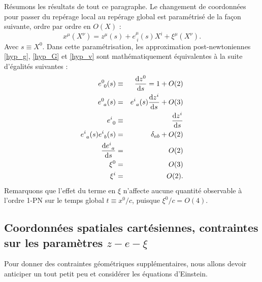 			Résumons les résultats de tout ce paragraphe. Le changement de coordonnées pour passer du repérage local au repérage global est paramétrisé de la façon suivante, ordre par ordre en $O(X)$ :
			\begin{equation}
				x^\mu(X^\nu)=z^\mu(s)+e^\mu_{\ i}(s)X^i + \xi^\mu(X^\nu).
			\end{equation}
			Avec $s\equiv X^0$.
			Dans cette paramétrisation, les approximation post-newtoniennes \ref{hyp_g}, \ref{hyp_G} et \ref{hyp_v} sont mathématiquement équivalentes à la suite d'égalités suivantes :
			\begin{eqnarray}
				e^0_{\ 0}(s)&\equiv&\frac{\mathrm{d} z^0}{\mathrm{d} s}=1+O(2) \label{e_00}\\
				e^0_{\ a}(s)&=&e^i_{\ a}(s)\frac{\mathrm{d} z^i}{\mathrm{d} s}+O(3) \label{e_0_a_pn} \\ 
				e^i_{\ 0}&\equiv&\frac{\mathrm{d} z^i}{\mathrm{d} s}  \label{e_i_0_pn} \\
				e^i_{\ a}(s)e^i_{\ b}(s)&=&\delta_{ab}+O(2) \label{eedelta} \\
				\frac{\mathrm{d} e^i_{\ a}}{\mathrm{d} s}&=&O(2)  \label{de_ds} \\
				\xi^0&=&O(3) \\
				\xi^i&=&O(2).
			\end{eqnarray}
			Remarquons que l'effet du terme en $\xi$ n'affecte aucune quantité observable à l'ordre 1-PN sur le temps global $t\equiv x^0/c$, puisque $\xi^0/c=O(4)$.

		\subsection{Coordonnées spatiales cartésiennes, contraintes sur les paramètres $z-e-\xi$}

			Pour donner des contraintes géométriques supplémentaires, nous allons devoir anticiper un tout petit peu et considérer les équations d'Einstein.

